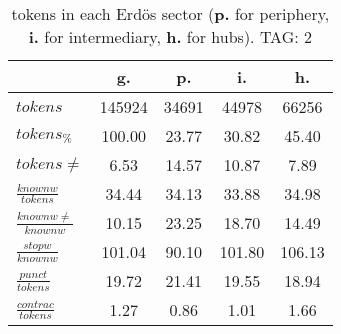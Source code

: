\begin{table}[h!]
\begin{center}
\begin{tabular}{| l | c | c | c | c |}\hline
 & g. & p. & i. & h. \\\hline
$tokens$ & 145924  & 34691  & 44978  & 66256 \\\hline
$tokens_{\%}$ & 100.00  & 23.77  & 30.82  & 45.40 \\\hline
$tokens \neq$ & 6.53  & 14.57  & 10.87  & 7.89 \\\hline
$\frac{knownw}{tokens}$ & 34.44  & 34.13  & 33.88  & 34.98 \\\hline
$\frac{knownw \neq}{knownw}$ & 10.15  & 23.25  & 18.70  & 14.49 \\\hline
$\frac{stopw}{knownw}$ & 101.04  & 90.10  & 101.80  & 106.13 \\\hline
$\frac{punct}{tokens}$ & 19.72  & 21.41  & 19.55  & 18.94 \\\hline
$\frac{contrac}{tokens}$ & 1.27  & 0.86  & 1.01  & 1.66 \\\hline
\end{tabular}
\caption{tokens in each Erd\"os sector ({{\bf p.}} for periphery, {{\bf i.}} for intermediary, 
    {{\bf h.}} for hubs). TAG: 2}
\end{center}
\end{table}